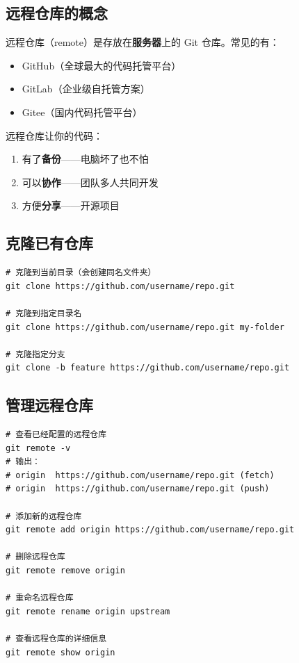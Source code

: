 \documentclass[12pt,a4paper]{article}
\begin{document}
\subsection{远程仓库的概念}

远程仓库（remote）是存放在\textbf{服务器}上的 Git 仓库。常见的有：

\begin{itemize}[itemsep=3pt]
    \item GitHub（全球最大的代码托管平台）
    \item GitLab（企业级自托管方案）
    \item Gitee（国内代码托管平台）
\end{itemize}

远程仓库让你的代码：
\begin{enumerate}[itemsep=3pt]
    \item 有了\textbf{备份}——电脑坏了也不怕
    \item 可以\textbf{协作}——团队多人共同开发
    \item 方便\textbf{分享}——开源项目
\end{enumerate}

\subsection{克隆已有仓库}

\begin{lstlisting}
# 克隆到当前目录（会创建同名文件夹）
git clone https://github.com/username/repo.git

# 克隆到指定目录名
git clone https://github.com/username/repo.git my-folder

# 克隆指定分支
git clone -b feature https://github.com/username/repo.git
\end{lstlisting}

\subsection{管理远程仓库}

\begin{lstlisting}
# 查看已经配置的远程仓库
git remote -v
# 输出：
# origin  https://github.com/username/repo.git (fetch)
# origin  https://github.com/username/repo.git (push)

# 添加新的远程仓库
git remote add origin https://github.com/username/repo.git

# 删除远程仓库
git remote remove origin

# 重命名远程仓库
git remote rename origin upstream

# 查看远程仓库的详细信息
git remote show origin
\end{lstlisting}
\end{document}
